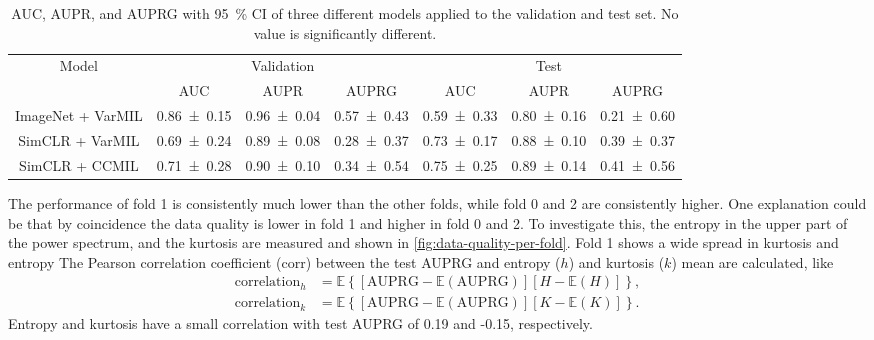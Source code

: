 \begin{table}
    \caption[AUC, AUPR, and AUPRG]{AUC, AUPR, and AUPRG with \qty{95}{\percent} CI of three different models applied to the validation and test set.
    No value is significantly different.}
    \label{tab:performance}
    \begin{tabular*}{\linewidth}{@{\extracolsep{\fill}}*{7}{c}}
        \toprule
        \multirow{2}{*}{Model} & \multicolumn{3}{c}{Validation} & \multicolumn{3}{c}{Test} \\
        \cmidrule{2-4} \cmidrule{5-7}
        & AUC & AUPR & AUPRG & AUC & AUPR & AUPRG \\
        \midrule
        ImageNet + VarMIL & \num{0.86 \pm 0.15} & \num{0.96 \pm 0.04} & \num{0.57 \pm 0.43} & \num{0.59 \pm 0.33} & \num{0.80 \pm 0.16} & \num{0.21 \pm 0.60} \\
        SimCLR + VarMIL & \num{0.69 \pm 0.24} & \num{0.89 \pm 0.08} & \num{0.28 \pm 0.37} & \num{0.73 \pm 0.17} & \num{0.88 \pm 0.10} & \num{0.39 \pm 0.37} \\
        SimCLR + CCMIL & \num{0.71 \pm 0.28} & \num{0.90 \pm 0.10} & \num{0.34 \pm 0.54} & \num{0.75 \pm 0.25} & \num{0.89 \pm 0.14} & \num{0.41 \pm 0.56} \\
        \bottomrule
    \end{tabular*}
\end{table}

The performance of fold 1 is consistently much lower than the other folds, while fold 0 and 2 are consistently higher.
One explanation could be that by coincidence the data quality is lower in fold 1 and higher in fold 0 and 2.
To investigate this, the entropy in the upper part of the power spectrum, and the kurtosis are measured and shown in \cref{fig:data-quality-per-fold}.
Fold 1 shows a wide spread in kurtosis and entropy
The Pearson correlation coefficient ($\mathrm{corr}$) between the test AUPRG and entropy ($h$) and kurtosis ($k$) mean are calculated, like
\begin{align}
    \mathrm{correlation}_h &= \mathbb{E}\left\{[\mathrm{AUPRG} - \mathbb{E}\left(\mathrm{AUPRG} \right)][H - \mathbb{E}\left(H\right)]\right\}, \\
    \mathrm{correlation}_k &= \mathbb{E}\left\{[\mathrm{AUPRG} - \mathbb{E}\left(\mathrm{AUPRG} \right)][K - \mathbb{E}\left(K\right)]\right\}.
\end{align}
Entropy and kurtosis have a small correlation with test AUPRG of 0.19 and -0.15, respectively.

